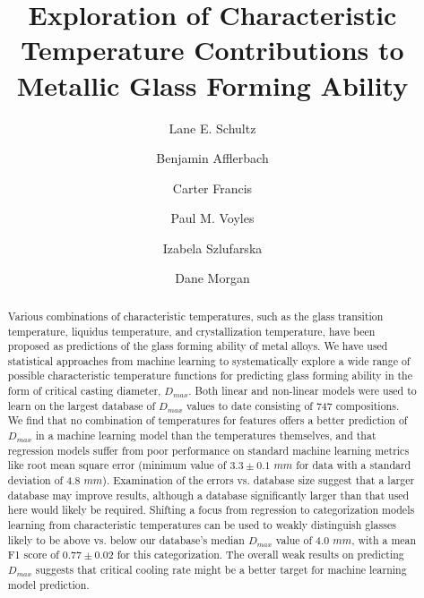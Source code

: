 \documentclass[11pt,a4paper]{article}
\title{Exploration of Characteristic Temperature Contributions to Metallic Glass Forming Ability}
\author[1]{Lane E. Schultz}
\author[1]{Benjamin Afflerbach}
\author[1]{Carter Francis}
\author[1]{Paul M. Voyles}
\author[1]{Izabela Szlufarska}
\author[1]{Dane Morgan}
\affil[1]{University of Wisconsin-Madison, 1500 engineering Drive, Madison, WI 53706, USA}
\begin{document}
\maketitle







\begin{abstract}
Various combinations of characteristic temperatures, such as the glass transition temperature, liquidus temperature, and crystallization temperature, have been proposed as predictions of the glass forming ability of metal alloys. We have used statistical approaches from machine learning to systematically explore a wide range of possible characteristic temperature functions for predicting glass forming ability in the form of critical casting diameter, $D_{max}$. Both linear and non-linear models were used to learn on the largest database of $D_{max}$ values to date consisting of 747 compositions. We find that no combination of temperatures for features offers a better prediction of $D_{max}$ in a machine learning model than the temperatures themselves, and that regression models suffer from poor performance on standard machine learning metrics like root mean square error (minimum value of $3.3 \pm 0.1$ $mm$ for data with a standard deviation of 4.8 $mm$). Examination of the errors vs. database size suggest that a larger database may improve results, although a database significantly larger than that used here would likely be required. Shifting a focus from regression to categorization models learning from characteristic temperatures can be used to weakly distinguish glasses likely to be above vs. below our database's median $D_{max}$ value of 4.0 $mm$, with a mean F1 score of $0.77 \pm 0.02$ for this categorization. The overall weak results on predicting $D_{max}$ suggests that critical cooling rate might be a better target for machine learning model prediction.
\end{abstract}
\end{document}
